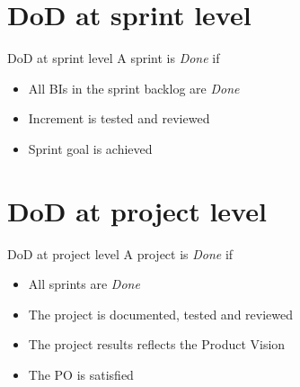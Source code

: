 \documentclass{beamer}
\begin{document}
\section{DoD at sprint level}
\begin{frame}{DoD at sprint level}
  A sprint is \emph{Done} if

  \begin{itemize}
  \item All BIs in the sprint backlog are \emph{Done}
  \item Increment is tested and reviewed
  \item Sprint goal is achieved
  \end{itemize}
\end{frame}
\section{DoD at project level}
\begin{frame}{DoD at project level}
  A project is \emph{Done} if

  \begin{itemize}
  \item All sprints are \emph{Done}
  \item The project is documented, tested and reviewed
  \item The project results reflects the Product Vision
  \item The PO is satisfied
  \end{itemize}
\end{frame}
\end{document}

